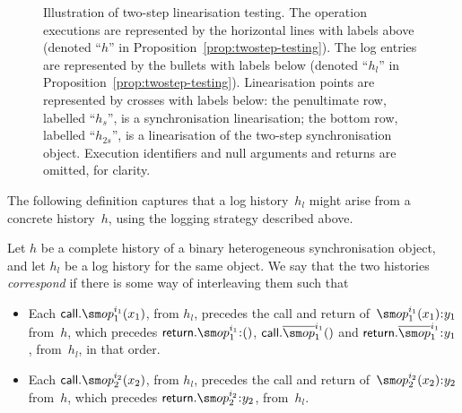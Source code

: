 \begin{figure}
\begin{center}
\def\y{-1.4} %
\def\ySLin{-2.5} %
\def\yLin{-3.6} %
\end{center}
\caption{Illustration of two-step linearisation testing.  The operation
  executions are represented by the horizontal lines with labels above
  (denoted ``$h$'' in Proposition~\ref{prop:twostep-testing}).  The log
  entries are represented by the bullets with labels below (denoted ``$h_l$''
  in Proposition~\ref{prop:twostep-testing}).  Linearisation points are
  represented by crosses with labels below: the penultimate row, labelled
  ``$h_s$'', is a synchronisation linearisation; the bottom row, labelled
  ``$h_{2s}$'', is a linearisation of the two-step synchronisation object.
  Execution identifiers and null arguments and returns are omitted, for
  clarity.}
\label{fig:twostep-timeline}
\end{figure}


The following definition captures that a log history~$h_l$ might arise from a
concrete history~$h$, using the logging strategy described above.
%
\begin{definition}
Let $h$ be a complete history of a binary heterogeneous synchronisation
object, and let $h_l$ be a log history for the same object.  We say that the
two histories \emph{correspond} if there is some way of interleaving them such
that
%
\begin{itemize}
\item Each $\call.\op_1^{i_1}(x_1)$, from $h_l$, precedes the call and return
  of~$\op_1^{i_1}(x_1)\::y_1$ from~$h$, which precedes $\return.\op_1^{i_1} \::
  ()$, $\call.\overline{\op}_1^{i_1}()$ and $\return.\overline{\op}_1^{i_1}
  \:: y_1$, from~$h_l$, in that order.

\item Each $\call.\op_2^{i_2}(x_2)$, from $h_l$, precedes the call and return
  of~$\op_2^{i_2}(x_2)\::y_2$ from~$h$, which precedes $\return.\op_2^{i_2}
  \:: y_2$, from~$h_l$.
\end{itemize}
\end{definition}

